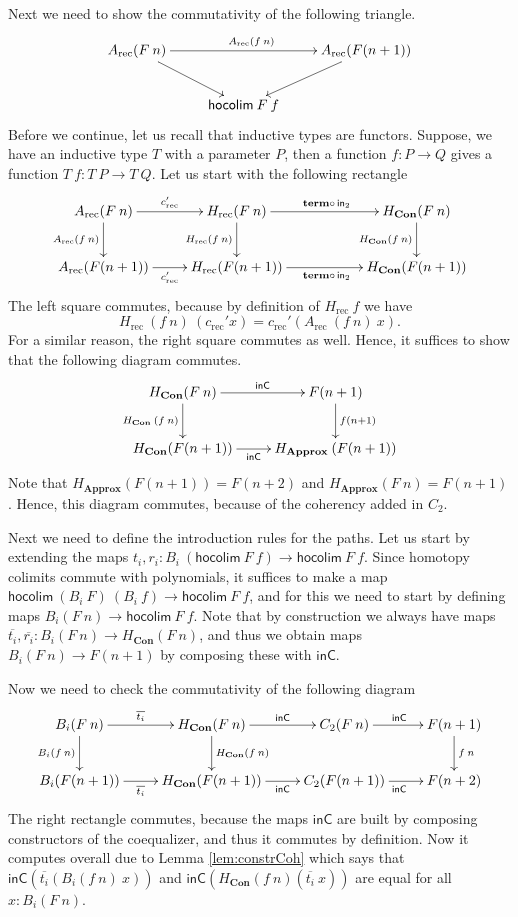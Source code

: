 \documentclass[a4paper,UKenglish]{lipics-v2016}
\newcommand{\Boperator}[1]{\mathsf{#1}}
\newcommand{\inn}{\Boperator{in}}
\newcommand{\comp}[0]{\circ \,}
\newcommand{\rec}[0]{\operatorname{rec}}
\newcommand{\term}[0]{\textbf{term}}
\newcommand{\Con}[0]{\textbf{Con}}
\newcommand{\Approx}[0]{\textbf{Approx}}
\newcommand{\inC}[0]{\Boperator{inC}}
\newcommand{\hocolim}[0]{\Boperator{hocolim}}
\begin{document}
Next we need to show the commutativity of the following triangle.
\[
\xymatrix
{
        A_{\rec}(F \> n) \ar[rr]^{A_{\rec}(f \> n)} \ar[dr] & & A_{\rec}(F(n+1)) \ar[dl] \\
        & \hocolim \> F \> f &
}
\]
Before we continue, let us recall that inductive types are functors.
Suppose, we have an inductive type $T$ with a parameter $P$, then a function $f : P \rightarrow Q$ gives a function $T \> f : T \> P \rightarrow T \> Q$.
Let us start with the following rectangle
\[
\xymatrix
{
        A_{\rec}(F \> n) \ar[r]^-{c_{\rec}'} \ar[d]_{A_{\rec}(f \> n)} 
                & H_{\rec}(F \> n) \ar[rr]^{\term \comp \inn_2} \ar[d]_{H_{\rec}(f \> n)} &
                & H_{\Con}(F \> n) \ar[d]_{H_{\Con}(f \> n)}\\
        A_{\rec}(F(n+1)) \ar[r]_-{c_{\rec}'} 
                & H_{\rec}(F(n+1)) \ar[rr]_{\term \comp \inn_2} &
                & H_{\Con}(F(n+1))
}
\]
The left square commutes, because by definition of $H_{\rec} \> f$ we have
\[
H_{\rec} \>(f \> n) \> (c_{\rec}' x) = c_{\rec}' (A_{\rec} \> (f \> n) \> x).
\]
For a similar reason, the right square commutes as well.
Hence, it suffices to show that the following diagram commutes.
\[
\xymatrix
{
        H_{\Con}(F \> n) \ar[d]_{H_{\Con} \> (f \> n)} \ar[r]^-{\inC}
                & F(n+1) \ar[d]^{f(n+1)}\\
        H_{\Con}(F(n+1)) \ar[r]_-{\inC}
                & H_{\Approx} \> (F(n+1))
}
\]
Note that $H_{\Approx}(F(n+1)) = F(n+2)$ and $H_{\Approx}(F \> n) = F(n+1)$.
Hence, this diagram commutes, because of the coherency added in $C_2$.

Next we need to define the introduction rules for the paths.
Let us start by extending the maps $t_i, r_i : B_i \> (\hocolim \> F \> f) \rightarrow \hocolim \> F \> f$.
Since homotopy colimits commute with polynomials, it suffices to make a map $\hocolim \> (B_i \> F) \> (B_i \> f)  \rightarrow \hocolim \> F \> f$, and for this we need to start by defining maps $B_i(F \> n) \rightarrow \hocolim \> F \> f$.
Note that by construction we always have maps $\overline{t_i}, \overline{r_i} : B_i(F \> n) \rightarrow H_{\Con}(F \> n)$, and thus we obtain maps $B_i(F \> n) \rightarrow F(n+1)$ by composing these with $\inC$.

Now we need to check the commutativity of the following diagram
\[
\xymatrix
{
        B_i(F \> n) 
        \ar[r]^-{\overline{t_i}} 
        \ar[d]_{B_i(f \> n)} 
        & 
        H_{\Con}(F \> n) 
        \ar[r]^-{\inC}
        \ar[d]^{H_{\Con}(f \> n)}  
        & 
        C_2(F \> n)
        \ar[r]^{\inC}
        & 
        F(n+1) 
        \ar[d]^{f \> n}\\
        B_i(F(n+1)) 
        \ar[r]_-{\overline{t_i}} 
        & 
        H_{\Con}(F(n+1)) 
        \ar[r]_-{\inC} 
        & 
        C_2(F(n+1))
        \ar[r]_{\inC} 
        & 
        F(n+2)
}
\]
The right rectangle commutes, because the maps $\inC$ are built by composing constructors of the coequalizer, and thus it commutes by definition.
Now it computes overall due to Lemma \ref{lem:constrCoh} which says that $\inC(\overline{t_i}(B_i(f \> n) \> x))$ and $\inC(H_{\Con}(f \> n)(\overline{t_i} \> x))$ are equal for all $x : B_i(F \> n)$.
\end{document}
